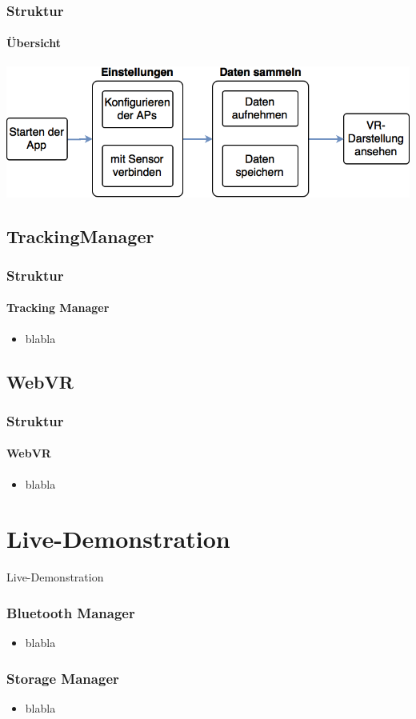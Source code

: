 \documentclass{beamer}
\begin{document}
\begin{frame}
\frametitle{Struktur}
\framesubtitle{Übersicht}
	\includegraphics[width=\textwidth]{diagram/flow.png}
\end{frame}

\subsection{TrackingManager}

\begin{frame}
\frametitle{Struktur}
\framesubtitle{Tracking Manager}
\begin{itemize}
  \item blabla
\end{itemize}
\end{frame}

\subsection{WebVR}

\begin{frame}
\frametitle{Struktur}
\framesubtitle{WebVR}
\begin{itemize}
  \item blabla
\end{itemize}
\end{frame}


\section{Live-Demonstration}

\begin{frame}
\begin{center}
	Live-Demonstration
\end{center}
\end{frame}



\begin{frame}
\frametitle{Bluetooth Manager}
\begin{itemize}
  \item blabla
\end{itemize}
\end{frame}

\begin{frame}
\frametitle{Storage Manager}
\begin{itemize}
  \item blabla
\end{itemize}
\end{frame}
\end{document}
